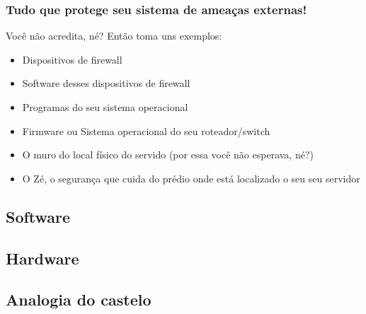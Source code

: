 \begin{frame}

	\frametitle{Tudo que protege seu sistema de ameaças externas!}
	
	Você não acredita, né? Então toma uns exemplos:

	\begin{itemize}
		\item{Dispositivos de firewall}
		\item{Software desses dispositivos de firewall}
		\item{Programas do seu sistema operacional}
		\item{Firmware ou Sistema operacional do seu roteador/switch}
		\item{O muro do local físico do servido (por essa você não esperava, né?)}
		\item{O Zé, o segurança que cuida do prédio onde está localizado o seu seu servidor}
	\end{itemize}

\end{frame}

\subsection{Software}





\subsection{Hardware}







\subsection{Analogia do castelo}


